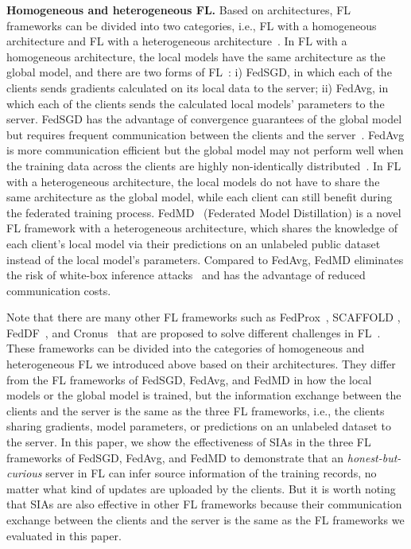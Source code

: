 \documentclass[10pt,journal,compsoc]{IEEEtran}
\begin{document}
\noindent \textbf{Homogeneous and heterogeneous FL.} Based on architectures, FL frameworks can be divided into two categories, {i.e.,} FL with a homogeneous architecture and FL with a heterogeneous architecture~\cite{lyu2020threats}. In FL with a homogeneous architecture, the local models have the same architecture as the global model, and there are two forms of FL~\cite{mcmahan2017communication}: i) FedSGD, in which each of the clients sends gradients calculated on its local data to the server; ii) FedAvg, in which each of the clients sends the calculated local models' parameters to the server. FedSGD has the advantage of convergence guarantees of the global model but requires frequent communication between the clients and the server~\cite{yin2021comprehensive}. FedAvg is more communication efficient but the global model may not perform well when the training data across the clients are highly non-identically distributed~\cite{li2020fedprox}. In FL with a heterogeneous architecture, the local models do not have to share the same architecture as the global model, while each client can still benefit during the federated training process. FedMD~\cite{li2019fedmd} (Federated Model Distillation) is a novel FL framework with a heterogeneous architecture, which shares the knowledge of each client's local model via their predictions on an unlabeled public dataset instead of the local model's parameters. Compared to FedAvg, FedMD eliminates the risk of white-box inference attacks~\cite{melis2019exploiting} and has the advantage of reduced communication costs. 

Note that there are many other FL frameworks such as FedProx~\cite{li2020fedprox}, SCAFFOLD \cite{karimireddy2020scaffold}, FedDF~\cite{lin2020ensemble}, and Cronus~\cite{chang2019cronus} that are proposed to solve different challenges in FL~\cite{yin2021comprehensive,li2021survey,wang2022octopus}. These frameworks can be divided into the categories of homogeneous and heterogeneous FL we introduced above based on their architectures. They differ from the FL frameworks of FedSGD, FedAvg, and FedMD in how the local models or the global model is trained, but the information exchange between the clients and the server is the same as the three FL frameworks, {i.e.,} the clients sharing gradients, model parameters, or predictions on an unlabeled dataset to the server. In this paper, we show the effectiveness of SIAs in the three FL frameworks of FedSGD, FedAvg, and FedMD to demonstrate that an {\em honest-but-curious} server in FL can infer source information of the training records, no matter what kind of updates are uploaded by the clients. But it is worth noting that SIAs are also effective in other FL frameworks because their communication exchange between the clients and the server is the same as the FL frameworks we evaluated in this paper.
\end{document}
